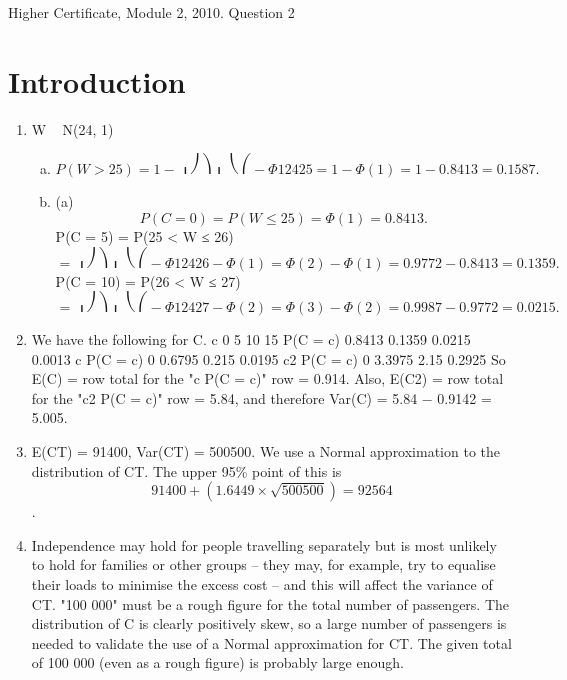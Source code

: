 \documentclass[a4paper,12pt]{article}
\begin{document}
Higher Certificate, Module 2, 2010. Question 2

\section{Introduction}

\begin{enumerate}
    \item 
W ~ N(24, 1)
\begin{enumerate}[(a)]
\item  \[P(W > 25) = 1 − ⎟⎠⎞⎜⎝⎛−\Phi12425 = 1 − \Phi(1) = 1 − 0.8413 = 0.1587.\]
\item  (a) \[P(C = 0) = P(W ≤ 25) = \Phi(1) = 0.8413.\]
P(C = 5) = P(25 < W ≤ 26)
\[= ⎟⎠⎞⎜⎝⎛−\Phi12426− \Phi(1) = \Phi(2) − \Phi(1) = 0.9772 − 0.8413 = 0.1359.\]
P(C = 10) = P(26 < W ≤ 27)
\[= ⎟⎠⎞⎜⎝⎛−\Phi12427− \Phi(2) = \Phi(3) − \Phi(2) = 0.9987 − 0.9772 = 0.0215.\]
\end{enumerate}
\item  We have the following for C.
c
0
5
10
15
P(C = c)
0.8413
0.1359
0.0215
0.0013
c P(C = c)
0
0.6795
0.215
0.0195
c2 P(C = c)
0
3.3975
2.15
0.2925
So E(C) = row total for the "c P(C = c)" row = 0.914.
Also, E(C2) = row total for the "c2 P(C = c)" row = 5.84,
and therefore Var(C) = 5.84 − 0.9142 = 5.005.
\item  E(CT) = 91400, Var(CT) = 500500.
We use a Normal approximation to the distribution of CT.
The upper 95\% point of this is \[91400 + (1.6449 \times \sqrt{500500}) = 92564\].
\item  Independence may hold for people travelling separately but is most unlikely to hold for families or other groups – they may, for example, try to equalise their loads to minimise the excess cost – and this will affect the variance of CT.
"100 000" must be a rough figure for the total number of passengers.
The distribution of C is clearly positively skew, so a large number of passengers is needed to validate the use of a Normal approximation for CT. The given total of 100 000 (even as a rough figure) is probably large enough.

\end{enumerate}
\end{document}
